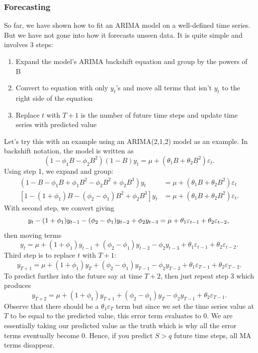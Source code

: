 \documentclass{article}
\begin{document}
  \subsubsection{Forecasting}
  So far, we have shown how to fit an ARIMA model on a well-defined time series. But we have not gone into how it forecasts unseen data. It is quite simple and involves 3 steps:
  \begin{enumerate}
    \item Expand the model's ARIMA backshift equation and group by the powers of B
    \item Convert to equation with only $y_t$'s and move all terms that isn't $y_t$ to the right side of the equation
    \item Replace $t$ with $T+1$ is the number of future time steps and update time series with predicted value
  \end{enumerate}
  Let's try this with an example using an ARIMA(2,1,2) model as an example. In backshift notation, the model is written as
  \begin{equation*}
    (1 - \phi_1B - \phi_2B^2)(1-B)y_t = \mu + (\theta_1B + \theta_2B^2)\varepsilon_t.
  \end{equation*}
  Using step 1, we expand and group:
  \begin{align*}
    (1 - B - \phi_1B + \phi_1B^2 - \phi_2B^2 + \phi_2B^3)y_t &= \mu + (\theta_1B + \theta_2B^2)\varepsilon_t\\
    [1 - (1 + \phi_1)B - (\phi_2 - \phi_1)B^2 + \phi_2B^3]y_t &= \mu + (\theta_1B + \theta_2B^2)\varepsilon_t.
  \end{align*}
  With second step, we convert giving
  \begin{equation*}
    y_t - (1 + \phi_1)y_{t-1} - (\phi_2 - \phi_1)y_{t-2} + \phi_2y_{t-3} = \mu + \theta_1\varepsilon_{t-1} + \theta_2\varepsilon_{t-2},\\
  \end{equation*}
  then moving terms
  \begin{equation*}
    y_t = \mu + (1 + \phi_1)y_{t-1} + (\phi_2 - \phi_1)y_{t-2} - \phi_2y_{t-3} + \theta_1\varepsilon_{t-1} + \theta_2\varepsilon_{t-2}.
  \end{equation*}
  Third step is to replace $t$ with $T+1$:
  \begin{equation*}
    y_{T+1} = \mu + (1 + \phi_1)y_{T} + (\phi_2 - \phi_1)y_{T-1} - \phi_2y_{T-2} + \theta_1\varepsilon_{T-1} + \theta_2\varepsilon_{T-2}.
  \end{equation*}
  To predict further into the future say at time $T+2$, then just repeat step 3 which produces
  \begin{equation*}
    y_{T+2} = \mu + (1 + \phi_1)y_{T+1} + (\phi_2 - \phi_1)y_{T} - \phi_2y_{T-1} + \theta_2\varepsilon_{T-1}.
  \end{equation*}
  Observe that there should be a $\theta_1\varepsilon_{T}$ term but since we set the time series value at $T$ to be equal to the predicted value, this error term evaluates to 0. We are essentially taking our predicted value as the truth which is why all the error terms eventually become 0. Hence, if you predict $S > q$ future time steps, all MA terms disappear. 
\end{document}
